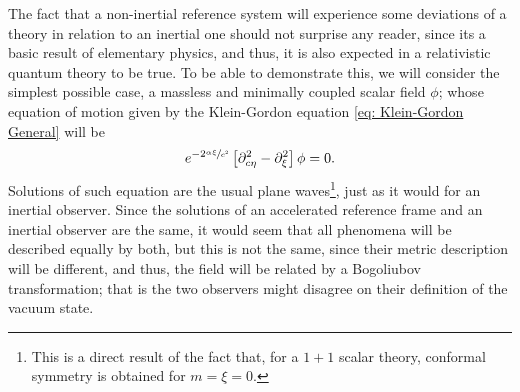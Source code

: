 The fact that a non-inertial reference system will experience some deviations of a theory in relation to an inertial one should not surprise any reader, since its a basic result of elementary physics, and thus, it is also expected in a relativistic quantum theory to be true. To be able to demonstrate this, we will consider the simplest possible case, a massless and minimally coupled scalar field $\phi$; whose equation of motion given by the Klein-Gordon equation \ref{eq: Klein-Gordon General} will be
\begin{equation}
	e^{-2\sfrac{\alpha\xi}{c^2}}\left[\partial^2_{c\eta}-\partial^2_\xi\right]\phi=0.
\end{equation}
Solutions of such equation are the usual plane waves\footnote{This is a direct result of the fact that, for a $1+1$ scalar theory, conformal symmetry is obtained for $m=\xi=0$.}, just as it would for an inertial observer. Since the solutions of an accelerated reference frame and an inertial observer are the same, it would seem that all phenomena will be described equally by both, but this is not the same, since their metric description will be different, and thus, the field will be related by a Bogoliubov transformation; that is the two observers might disagree on their definition of the vacuum state.

